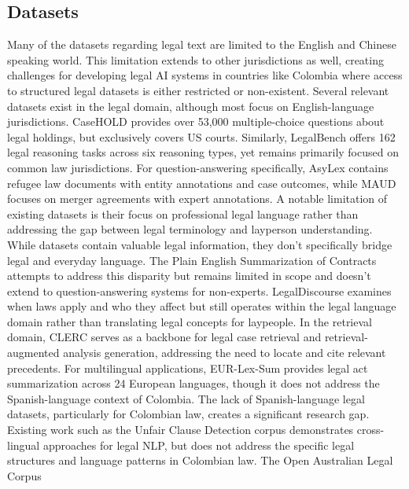 \subsection{Datasets}
Many of the datasets regarding legal text are limited to the English and
Chinese speaking world. This limitation extends to other jurisdictions as well, 
creating challenges for developing legal AI systems in countries like Colombia 
where access to structured legal datasets is either restricted or non-existent.
Several relevant datasets exist in the legal domain, although most focus on 
English-language jurisdictions. CaseHOLD \cite{zheng2021does} provides over 
53,000 multiple-choice questions about legal holdings, but exclusively 
covers US courts. Similarly, LegalBench \cite{guha2023legalbench} offers 
162 legal reasoning tasks across six reasoning types, yet remains primarily 
focused on common law jurisdictions. For question-answering specifically, 
AsyLex \cite{tay2023asylex} contains refugee law documents with entity 
annotations and case outcomes, while MAUD \cite{wang2023maud} focuses 
on merger agreements with expert annotations.
A notable limitation of existing datasets is their focus on professional 
legal language rather than addressing the gap between legal terminology and 
layperson understanding. While datasets contain valuable legal information, 
they don't specifically bridge legal and everyday language. The Plain English 
Summarization of Contracts \cite{manor2019plain} attempts to address this disparity 
but remains limited in scope and doesn't extend to question-answering systems for 
non-experts. LegalDiscourse \cite{spangher-etal-2024-legaldiscourse} examines when 
laws apply and who they affect but still operates within the legal language domain 
rather than translating legal concepts for laypeople.
In the retrieval domain, CLERC \cite{hou2024clercdatasetlegalcase} serves as a 
backbone for legal case retrieval and retrieval-augmented analysis generation, 
addressing the need to locate and cite relevant precedents. For multilingual 
applications, EUR-Lex-Sum \cite{aumiller-etal-2022-eur} provides legal act 
summarization across 24 European languages, though it does not address the 
Spanish-language context of Colombia.
The lack of Spanish-language legal datasets, particularly for Colombian law, 
creates a significant research gap. Existing work such as the Unfair Clause 
Detection corpus \cite{Galassi2024} demonstrates cross-lingual approaches 
for legal NLP, but does not address the specific legal structures and language 
patterns in Colombian law. The Open Australian Legal Corpus \cite{butler-2025-open-australian-legal-corpus} 
